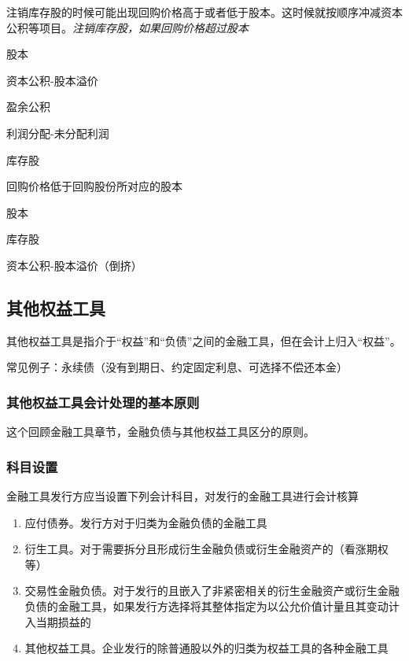 \documentclass[UTF8,12pt]{ctexart}
\newenvironment{Dr}{%
	\begin{list}{}%
		{
			\setlength{\leftmargin}{2em}
			\setlength{\labelwidth}{2em}
			\setlength{\labelsep}{0pt}
			\setlength{\itemindent}{0pt}
			\setlength{\listparindent}{0pt}
			\setlength{\parsep}{0pt}
			\setlength{\topsep}{0pt}
		}
		\item[\textbf{借：}]
	}{%
	\end{list}
}
\newenvironment{Cr}{%
	\begin{list}{}%
		{
			\setlength{\leftmargin}{2em}
			\setlength{\labelwidth}{2em}
			\setlength{\labelsep}{0pt}
			\setlength{\itemindent}{0pt}
			\setlength{\listparindent}{0pt}
			\setlength{\parsep}{0pt}
			\setlength{\topsep}{0pt}
		}
		\item[\textbf{贷：}]
	}{%
	\end{list}
}
\numberwithin{equation}{section} %
\numberwithin{figure}{section}
\numberwithin{table}{section}
\begin{document}
	
	注销库存股的时候可能出现回购价格高于或者低于股本。这时候就按顺序冲减资本公积等项目。\textit{注销库存股，如果回购价格超过股本}
	
	\begin{Dr}
		股本
		
		资本公积-股本溢价
		
		盈余公积
		
		利润分配-未分配利润
	\end{Dr}
	\begin{Cr}
		库存股
	\end{Cr}

	回购价格低于回购股份所对应的股本
	
	\begin{Dr}
		股本
	\end{Dr}
	\begin{Cr}
		库存股
		
		资本公积-股本溢价（倒挤）
	\end{Cr}
	
	\subsection{其他权益工具}
	其他权益工具是指介于“权益”和“负债”之间的金融工具，但在会计上归入“权益”。
	
	常见例子：永续债（没有到期日、约定固定利息、可选择不偿还本金）
	
	\subsubsection{其他权益工具会计处理的基本原则}
	这个回顾金融工具章节，金融负债与其他权益工具区分的原则。
	
	\subsubsection{科目设置}
	金融工具发行方应当设置下列会计科目，对发行的金融工具进行会计核算
	\begin{enumerate}
		\item 应付债券。发行方对于归类为金融负债的金融工具
		
		\item 衍生工具。对于需要拆分且形成衍生金融负债或衍生金融资产的（看涨期权等）
		
		\item 交易性金融负债。对于发行的且嵌入了非紧密相关的衍生金融资产或衍生金融负债的金融工具，如果发行方选择将其整体指定为以公允价值计量且其变动计入当期损益的
		
		\item 其他权益工具。企业发行的除普通股以外的归类为权益工具的各种金融工具
	\end{enumerate}
	
\end{document}
